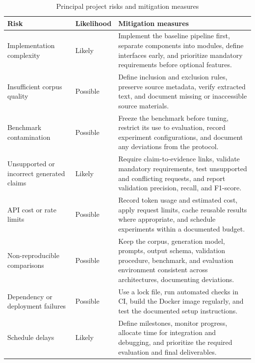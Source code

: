 \documentclass[12pt,a4paper]{article}
\begin{document}
\begin{table}[htbp]
\centering
\small
\renewcommand{\arraystretch}{1.3}
\begin{tabularx}{\textwidth}{|p{29mm}|p{18mm}|X|}
\hline
\textbf{Risk} &
\textbf{Likelihood} &
\textbf{Mitigation measures} \\
\hline

Implementation complexity &
Likely &
Implement the baseline pipeline first, separate components
into modules, define interfaces early, and prioritize
mandatory requirements before optional features. \\
\hline

Insufficient corpus quality &
Possible &
Define inclusion and exclusion rules, preserve source
metadata, verify extracted text, and document missing or
inaccessible source materials. \\
\hline

Benchmark contamination &
Possible &
Freeze the benchmark before tuning, restrict its use to
evaluation, record experiment configurations, and document
any deviations from the protocol. \\
\hline

Unsupported or incorrect generated claims &
Likely &
Require claim-to-evidence links, validate mandatory
requirements, test unsupported and conflicting requests,
and report validation precision, recall, and F1-score. \\
\hline

API cost or rate limits &
Possible &
Record token usage and estimated cost, apply request limits,
cache reusable results where appropriate, and schedule
experiments within a documented budget. \\
\hline

Non-reproducible comparisons &
Possible &
Keep the corpus, generation model, prompts, output schema,
validation procedure, benchmark, and evaluation environment
consistent across architectures, documenting deviations. \\
\hline

Dependency or deployment failures &
Possible &
Use a lock file, run automated checks in CI, build the
Docker image regularly, and test the documented setup
instructions. \\
\hline

Schedule delays &
Likely &
Define milestones, monitor progress, allocate time for
integration and debugging, and prioritize the required
evaluation and final deliverables. \\
\hline

\end{tabularx}
\caption{Principal project risks and mitigation measures}
\label{tab:project-risks}
\end{table}
\end{document}
